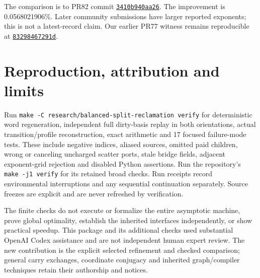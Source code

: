 \documentclass[11pt]{article}
\begin{document}
The comparison is to PR82 commit
\href{https://github.com/rohanarun/integer-mult-bounds/tree/3410b940aa26e5876202152dfa7c4f66451ee22c}{\texttt{3410b940aa26}}.
The improvement is 0.0568021906\%. Later community submissions have larger
reported exponents; this is not a latest-record claim. Our earlier PR77
witness remains reproducible at
\href{https://github.com/huxint/integer-mult-bounds/tree/83298467291d3bd4b53f76faaef60dbf585be171}{\texttt{83298467291d}}.

\section{Reproduction, attribution and limits}
Run \texttt{make -C research/balanced-split-reclamation verify} for deterministic
word regeneration, independent full dirty-basis replay in both orientations,
actual transition/profile reconstruction, exact arithmetic and 17 focused
failure-mode tests. These include negative indices, aliased sources, omitted
paid children, wrong or canceling uncharged scatter ports, stale bridge fields,
adjacent exponent-grid rejection and disabled Python assertions. Run the
repository's \texttt{make -j1 verify} for its retained broad checks. Run receipts
record environmental interruptions and any sequential continuation separately.
Source freezes are explicit and are never refreshed by verification.

The finite checks do not execute or formalize the entire asymptotic machine,
prove global optimality, establish the inherited interfaces independently, or
show practical speedup. This package and its additional checks used substantial
OpenAI Codex assistance and are not independent human expert review. The new
contribution is the explicit selected refinement and checked comparison;
general carry exchanges, coordinate conjugacy and inherited graph/compiler
techniques retain their authorship and notices.
\end{document}

